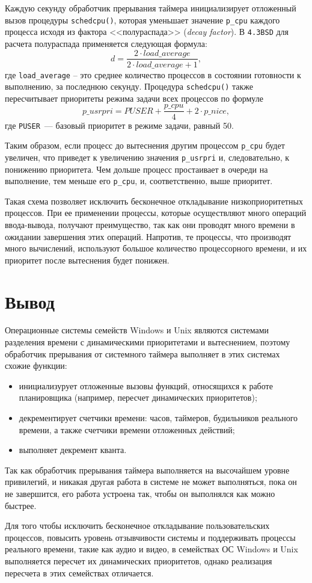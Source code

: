 Каждую секунду обработчик прерывания таймера инициализирует отложенный вызов процедуры \texttt{schedcpu()}, которая уменьшает значение \texttt{p{\_}cpu} каждого процесса исходя из фактора <<полураспада>> (\textit{decay factor}). 
В \texttt{4.3BSD} для расчета полураспада применяется следующая формула:
\[
d = \frac{2\cdot load{\_}average}{2\cdot load{\_}average + 1},
\]
где \texttt{load{\_}average} -- это среднее количество процессов в состоянии готовности к выполнению, за последнюю секунду. 
Процедура \texttt{schedcpu()} также пересчитывает приоритеты режима задачи всех процессов по формуле
\[
{p\_usrpri} = PUSER + \frac{p{\_}cpu}{4} + 2\cdot {p{\_}nice},
\]
где \texttt{PUSER}~--- базовый приоритет в режиме задачи, равный 50.

Таким образом, если процесс до вытеснения другим процессом \texttt{p{\_}cpu} будет увеличен, что приведет к увеличению значения \texttt{p{\_}usrpri} и, следовательно, к понижению приоритета. Чем дольше процесс простаивает в очереди на выполнение, тем меньше его \texttt{p{\_}cpu}, и, соответственно, выше приоритет. 

Такая схема позволяет исключить бесконечное откладывание низкоприоритетных процессов. 
При ее применении процессы, которые осуществляют много операций ввода-вывода, получают преимущество, так как они проводят много времени в ожидании завершения этих операций. Напротив, те процессы, что производят много вычислений, используют большое количество процессорного времени, и их приоритет после вытеснения будет понижен. 

\chapter*{Вывод}

Операционные системы семейств Windows и Unix являются системами разделения времени с динамическими приоритетами и вытеснением, поэтому обработчик прерывания от системного таймера выполняет в этих системах схожие функции: 

\begin{itemize}
	\item инициализурует отложенные вызовы функций, относящихся к работе планировщика (например, пересчет динамических приоритетов);
	\item декрементирует счетчики времени: часов, таймеров, будильников реального времени, а также счетчики времени отложенных действий;
	\item выполняет декремент кванта.
\end{itemize}

Так как обработчик прерывания таймера выполняется на высочайшем уровне привилегий, и никакая другая работа в системе не может выполняться, пока он не завершится, его работа устроена так, чтобы он выполнялся как можно быстрее. 

Для того чтобы исключить бесконечное откладывание пользовательских процессов, повысить уровень отзывчивости системы и поддерживать процессы реального времени, такие как аудио и видео, в семействах ОС Windows и Unix выполняется пересчет их динамических приоритетов, однако реализация пересчета в этих семействах отличается. 
